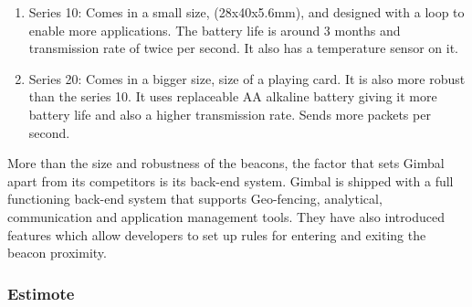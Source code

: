 \begin{enumerate}
\item Series 10: Comes in a small size, (28x40x5.6mm), and designed with
a loop to enable more applications. The battery life is around
3 months and transmission rate of twice per second. It also has a
temperature sensor on it.
\item Series 20: Comes in a bigger size, size of a playing card. It is also
more robust than the series 10. It uses replaceable AA alkaline battery
giving it more battery life and also a higher transmission rate. Sends more packets per second.
\end{enumerate}
More than the size and robustness of the beacons, the factor that
sets Gimbal apart from its competitors is its back-end system. Gimbal
is shipped with a full functioning back-end system that supports Geo-fencing\cite{geofencing},
analytical, communication and application management tools. They have
also introduced features which allow developers to set up rules
for entering and exiting the beacon proximity.


\subsubsection{Estimote}

